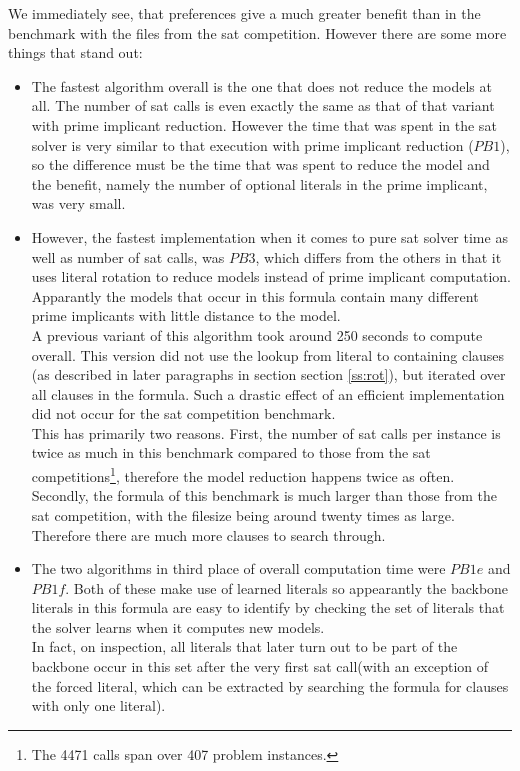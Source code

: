 We immediately see, that preferences give a much greater benefit than in the benchmark with the files from the sat competition. However there are some more things that stand out:
\begin{itemize}
\item The fastest algorithm overall is the one that does not reduce the models at all. The number of sat calls is even exactly the same as that of that variant with prime implicant reduction. However the time that was spent in the sat solver is very similar to that execution with prime implicant reduction ($PB1$), so the difference must be the time that was spent to reduce the model and the benefit, namely the number of optional literals in the prime implicant, was very small.
\item However, the fastest implementation when it comes to pure sat solver time as well as number of sat calls, was $PB3$, which differs from the others in that it uses literal rotation to reduce models instead of prime implicant computation. Apparantly the models that occur in this formula contain many different prime implicants with little distance to the model.\\
A previous variant of this algorithm took around 250 seconds to compute overall. This version did not use the lookup from literal to containing clauses (as described in later paragraphs in section section \ref{ss:rot}), but iterated over all clauses in the formula. Such a drastic effect of an efficient implementation did not occur for the sat competition benchmark.\\
This has primarily two reasons. First, the number of sat calls per instance is twice as much in this benchmark compared to those from the sat competitions\footnote{The 4471 calls span over 407 problem instances.}, therefore the model reduction happens twice as often. Secondly, the formula of this benchmark is much larger than those from the sat competition, with the filesize being around twenty times as large. Therefore there are much more clauses to search through.
\item The two algorithms in third place of overall computation time were $PB1e$ and $PB1f$. Both of these make use of learned literals so appearantly the backbone literals in this formula are easy to identify by checking the set of literals that the solver learns when it computes new models.\\
In fact, on inspection, all literals that later turn out to be part of the backbone occur in this set after the very first sat call(with an exception of the forced literal, which can be extracted by searching the formula for clauses with only one literal).

\end{itemize}

